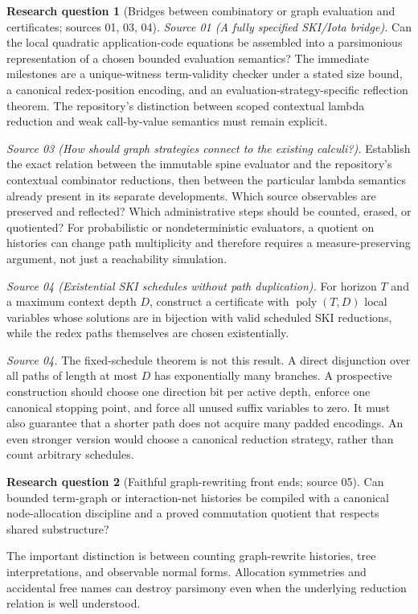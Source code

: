 \documentclass[11pt,a4paper]{article}
\theoremstyle{definition}
\newtheorem{question}[question]{Research question}
\theoremstyle{remark}
\DeclareMathOperator{\poly}{poly}
\begin{document}
\begin{question}[Bridges between combinatory or graph evaluation and certificates; sources 01, 03, 04]\label{cdc:q:ski}
\emph{Source 01 (A fully specified SKI/Iota bridge).}
Can the local quadratic application-code equations be assembled into a parsimonious representation of a chosen bounded evaluation semantics? The immediate milestones are a unique-witness term-validity checker under a stated size bound, a canonical redex-position encoding, and an evaluation-strategy-specific reflection theorem. The repository's distinction between scoped contextual lambda reduction and weak call-by-value semantics must remain explicit.

\emph{Source 03 (How should graph strategies connect to the existing calculi?).}
Establish the exact relation between the immutable spine evaluator and the
repository's contextual combinator reductions, then between the particular
lambda semantics already present in its separate developments. Which source
observables are preserved and reflected? Which administrative steps should be
counted, erased, or quotiented? For probabilistic or nondeterministic evaluators,
a quotient on histories can change path multiplicity and therefore requires a
measure-preserving argument, not just a reachability simulation.

\emph{Source 04 (Existential SKI schedules without path duplication).}
For horizon $T$ and a maximum context depth $D$, construct a certificate with $\poly(T,D)$ local variables whose solutions are in bijection with valid scheduled SKI reductions, while the redex paths themselves are chosen existentially.
\end{question}

\emph{Source 04.} The fixed-schedule theorem is not this result. A direct disjunction over all paths of length at most $D$ has exponentially many branches. A prospective construction should choose one direction bit per active depth, enforce one canonical stopping point, and force all unused suffix variables to zero. It must also guarantee that a shorter path does not acquire many padded encodings. An even stronger version would choose a canonical reduction strategy, rather than count arbitrary schedules.

\begin{question}[Faithful graph-rewriting front ends; source 05]
Can bounded term-graph or interaction-net histories be compiled with a canonical node-allocation discipline and a proved commutation quotient that respects shared substructure?
\end{question}
The important distinction is between counting graph-rewrite histories, tree interpretations, and observable normal forms. Allocation symmetries and accidental free names can destroy parsimony even when the underlying reduction relation is well understood.
\end{document}
